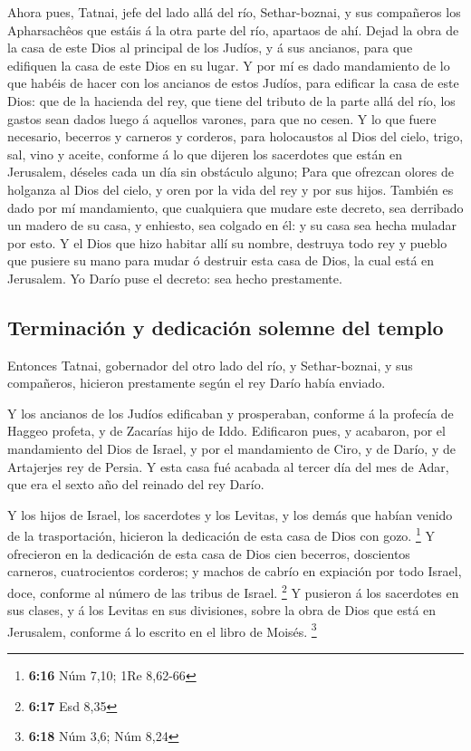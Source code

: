  Ahora pues, Tatnai, jefe del lado allá del río,
Sethar-boznai, y sus compañeros los Apharsachêos que estáis á la otra
parte del río, apartaos de ahí.  Dejad la obra de la casa de
este Dios al principal de los Judíos, y á sus ancianos, para que
edifiquen la casa de este Dios en su lugar.  Y por mí es
dado mandamiento de lo que habéis de hacer con los ancianos de estos
Judíos, para edificar la casa de este Dios: que de la hacienda del rey,
que tiene del tributo de la parte allá del río, los gastos sean dados
luego á aquellos varones, para que no cesen.  Y lo que fuere
necesario, becerros y carneros y corderos, para holocaustos al Dios del
cielo, trigo, sal, vino y aceite, conforme á lo que dijeren los
sacerdotes que están en Jerusalem, déseles cada un día sin obstáculo
alguno;  Para que ofrezcan olores de holganza al Dios del
cielo, y oren por la vida del rey y por sus hijos.  También
es dado por mí mandamiento, que cualquiera que mudare este decreto, sea
derribado un madero de su casa, y enhiesto, sea colgado en él: y su casa
sea hecha muladar por esto.  Y el Dios que hizo habitar
allí su nombre, destruya todo rey y pueblo que pusiere su mano para
mudar ó destruir esta casa de Dios, la cual está en Jerusalem. Yo Darío
puse el decreto: sea hecho prestamente.

\hypertarget{terminaciuxf3n-y-dedicaciuxf3n-solemne-del-templo}{%
\subsection{Terminación y dedicación solemne del
templo}\label{terminaciuxf3n-y-dedicaciuxf3n-solemne-del-templo}}

 Entonces Tatnai, gobernador del otro lado del río, y
Sethar-boznai, y sus compañeros, hicieron prestamente según el rey Darío
había enviado.

 Y los ancianos de los Judíos edificaban y prosperaban,
conforme á la profecía de Haggeo profeta, y de Zacarías hijo de Iddo.
Edificaron pues, y acabaron, por el mandamiento del Dios de Israel, y
por el mandamiento de Ciro, y de Darío, y de Artajerjes rey de Persia.
 Y esta casa fué acabada al tercer día del mes de Adar, que
era el sexto año del reinado del rey Darío.

 Y los hijos de Israel, los sacerdotes y los Levitas, y los
demás que habían venido de la trasportación, hicieron la dedicación de
esta casa de Dios con gozo. \footnote{\textbf{6:16} Núm 7,10; 1Re
  8,62-66}  Y ofrecieron en la dedicación de esta casa de
Dios cien becerros, doscientos carneros, cuatrocientos corderos; y
machos de cabrío en expiación por todo Israel, doce, conforme al número
de las tribus de Israel. \footnote{\textbf{6:17} Esd 8,35} 
Y pusieron á los sacerdotes en sus clases, y á los Levitas en sus
divisiones, sobre la obra de Dios que está en Jerusalem, conforme á lo
escrito en el libro de Moisés. \footnote{\textbf{6:18} Núm 3,6; Núm 8,24}

